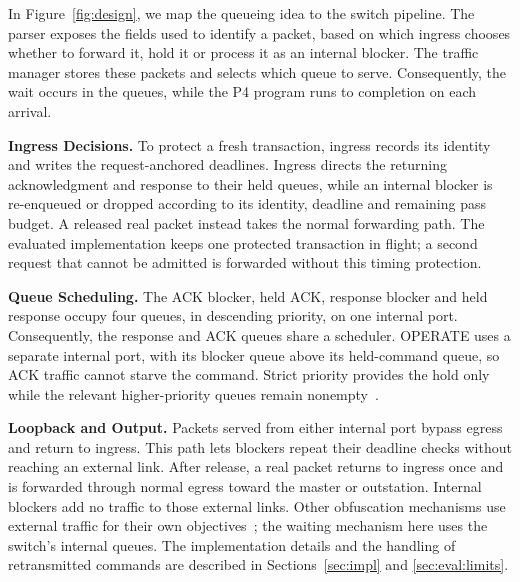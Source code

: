 In Figure~\ref{fig:design}, we map the queueing idea to the switch pipeline. The parser exposes the fields used to identify a packet, based on which ingress chooses whether to
forward it, hold it or process it as an internal blocker. The traffic manager stores these packets
and selects which queue to serve.
Consequently, the wait occurs in the queues, while the P4 program runs to completion on each arrival.

\textbf{Ingress Decisions.} To protect a fresh transaction, ingress records its identity and
writes the request-anchored deadlines. Ingress directs the returning acknowledgment and response to their held queues, while an internal
blocker is re-enqueued or dropped according to its identity, deadline and remaining pass budget. A released real packet instead takes the normal
forwarding path. The evaluated implementation keeps one protected transaction in flight; a second
request that cannot be admitted is forwarded without this timing protection.

\textbf{Queue Scheduling.} The ACK blocker, held ACK, response blocker and held response occupy
four queues, in descending priority, on one internal port. Consequently, the response and ACK queues share a scheduler. OPERATE uses a separate internal port, with its blocker queue above
its held-command queue, so ACK traffic cannot starve the command. Strict priority provides the
hold only while the relevant higher-priority queues remain nonempty~\cite{sppifo2020}.

\textbf{Loopback and Output.} Packets served from either internal port bypass egress and return
to ingress. This path lets blockers repeat their deadline checks without reaching an external link.
After release, a real packet returns to ingress once and is forwarded through normal egress toward
the master or outstation. Internal blockers add no traffic to those external links. Other
obfuscation mechanisms use external traffic for their own objectives~\cite{ditto2022, dyer2012};
the waiting mechanism here uses the switch's internal queues. The implementation details and the
handling of retransmitted commands are described in Sections~\ref{sec:impl} and
\ref{sec:eval:limits}.
